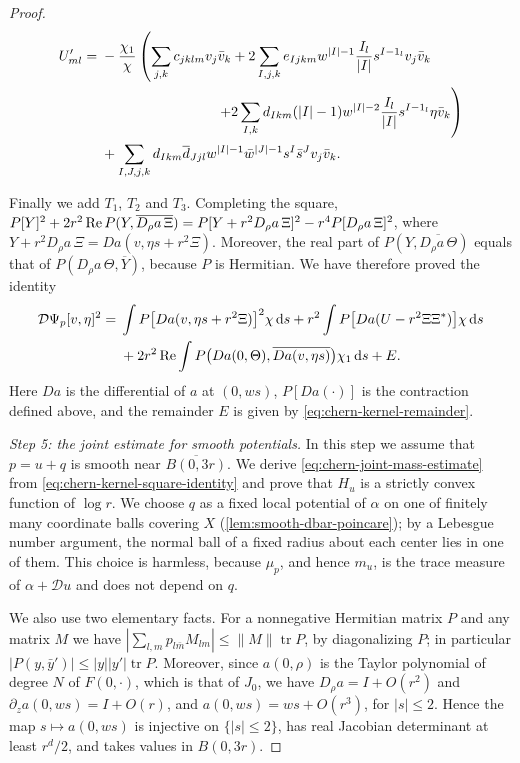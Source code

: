 \begin{proof}
\begin{align*}
 U'_{ml}={}&-\frac{\chi_1}{\chi}\left(
      \sum_{j,k}c_{jklm}v_j\bar v_k
      +2\sum_{I,j,k}e_{Ijkm}w^{|I|-1}
                         \frac{I_l}{|I|}s^{I-1_l}v_j\bar v_k\right.\\
 &\hspace{29mm}\left.
      +2\sum_{I,k}d_{Ikm}(|I|-1)w^{|I|-2}
                          \frac{I_l}{|I|}s^{I-1_l}\eta\bar v_k\right)\\
 &+\sum_{I,J,j,k}d_{Ikm}\overline d_{Jjl}
                    w^{|I|-1}\bar w^{|J|-1}s^I\bar s^Jv_j\bar v_k.
\end{align*}

Finally we add $T_1$, $T_2$ and $T_3$. Completing the square, $P[Y]^2+2r^2\operatorname{Re} P(Y,\overline{D_\rho a\,\Xi})=P[Y+r^2D_\rho a\,\Xi]^2-r^4P[D_\rho a\,\Xi]^2$, where $Y+r^2D_\rho a\,\Xi=Da(v,\eta s+r^2\Xi)$. Moreover, the real part of $P(Y,\overline{D_\rho a\,\Theta})$ equals that of $P(D_\rho a\,\Theta,\overline Y)$, because $P$ is Hermitian. We have therefore proved the identity
\begin{equation}\label{eq:chern-kernel-square-identity}
 \begin{aligned}
 \mathcal D\Psi_p[v,\eta]^2
   ={}&\int P\bigl[Da(v,\eta s+r^2\Xi)\bigr]^2\chi\,\mathrm ds
       +r^2\int P\bigl[Da(U-r^2\Xi\Xi^*)\bigr]\chi\,\mathrm ds\\
   &+2r^2\operatorname{Re}\int P\bigl(Da(0,\Theta),\overline{Da(v,\eta s)}\bigr)\chi_1\,\mathrm ds+E.
 \end{aligned}
\end{equation}
Here $Da$ is the differential of $a$ at $(0,ws)$, $P[Da(\cdot)]$ is the contraction defined above, and the remainder $E$ is given by \eqref{eq:chern-kernel-remainder}.

\emph{Step 5: the joint estimate for smooth potentials.} In this step we assume that $p=u+q$ is smooth near $\overline{B(0,3r)}$. We derive \eqref{eq:chern-joint-mass-estimate} from \eqref{eq:chern-kernel-square-identity} and prove that $H_u$ is a strictly convex function of $\log r$. We choose $q$ as a fixed local potential of $\alpha$ on one of finitely many coordinate balls covering $X$ (\cref{lem:smooth-dbar-poincare}); by a Lebesgue number argument, the normal ball of a fixed radius about each center lies in one of them. This choice is harmless, because $\mu_p$, and hence $m_u$, is the trace measure of $\alpha+\mathcal Du$ and does not depend on $q$.

We also use two elementary facts. For a nonnegative Hermitian matrix $P$ and any matrix $M$ we have $|\sum_{l,m}p_{l\bar m}M_{lm}|\leq\|M\|\operatorname{tr}P$, by diagonalizing $P$; in particular $|P(y,\bar y')|\leq|y||y'|\operatorname{tr}P$. Moreover, since $a(0,\rho)$ is the Taylor polynomial of degree $N$ of $F(0,\cdot)$, which is that of $J_0$, we have $D_\rho a=I+O(r^2)$ and $\partial_za(0,ws)=I+O(r)$, and $a(0,ws)=ws+O(r^3)$, for $|s|\leq2$. Hence the map $s\mapsto a(0,ws)$ is injective on $\{|s|\leq2\}$, has real Jacobian determinant at least $r^d/2$, and takes values in $B(0,3r)$.


\end{proof}
